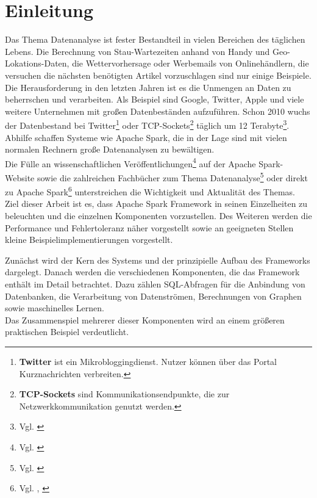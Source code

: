 \newpage
\chapter{Einleitung} 

Das Thema Datenanalyse ist fester Bestandteil in vielen Bereichen des täglichen Lebens. Die Berechnung von Stau-Wartezeiten anhand von Handy und Geo-Lokations-Daten, die Wettervorhersage oder Werbemails von Onlinehändlern, die versuchen die nächsten benötigten Artikel vorzuschlagen sind nur einige Beispiele.\\

\noindent
Die Herausforderung in den letzten Jahren ist es die Unmengen an Daten zu beherrschen und verarbeiten. Als Beispiel sind Google, Twitter, Apple und viele weitere Unternehmen mit großen Datenbeständen aufzuführen. Schon 2010 wuchs der Datenbestand bei Twitter\footnote{\textbf{Twitter} ist ein Mikrobloggingdienst. Nutzer können über das Portal Kurznachrichten verbreiten. } oder TCP-Sockets\footnote{\textbf{TCP-Sockets} sind Kommunikationsendpunkte, die zur Netzwerkkommunikation genutzt werden. } täglich um 12 Terabyte\footnote{Vgl. \cite{TWITTER_12}}. \\
Abhilfe schaffen Systeme wie Apache Spark, die in der Lage sind mit vielen normalen Rechnern große Datenanalysen zu bewältigen. \\

\noindent
Die Fülle an wissenschaftlichen Veröffentlichungen\footnote{Vgl. \cite{SPRESEARCH}} auf der Apache Spark-Website sowie die zahlreichen Fachbücher zum Thema Datenanalyse\footnote{Vgl. \cite{DA15}} oder direkt zu Apache Spark\footnote{Vgl. \cite{AAWS15}, \cite{BDS16}} unterstreichen die Wichtigkeit und Aktualität des Themas.\\

\noindent
Ziel dieser Arbeit ist es, dass Apache Spark Framework in seinen Einzelheiten zu beleuchten und die einzelnen Komponenten vorzustellen. Des Weiteren werden die Performance und Fehlertoleranz näher vorgestellt sowie an geeigneten Stellen kleine Beispielimplementierungen vorgestellt.

\noindent
Zunächst wird der Kern des Systems und der prinzipielle Aufbau des Frameworks dargelegt. Danach werden die verschiedenen Komponenten, die das Framework enthält im Detail betrachtet. Dazu zählen SQL-Abfragen für die Anbindung von Datenbanken, die Verarbeitung von Datenströmen, Berechnungen von Graphen sowie maschinelles Lernen.\\
Das Zusammenspiel mehrerer dieser Komponenten wird an einem größeren praktischen Beispiel verdeutlicht. \\

